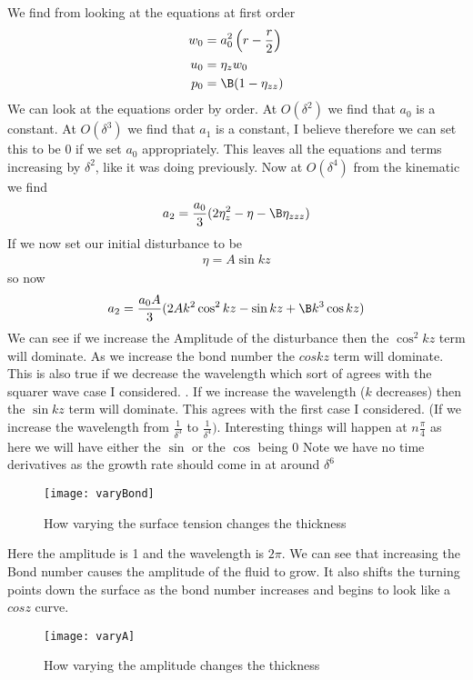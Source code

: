 \documentclass[12pt]{article}
\begin{document}
	We find from looking at the equations at first order
	\begin{align}
	w_0 &=a_0^2\left(r-\frac{r}{2}\right)\\
	u_0 & = \eta_z w_0 \\
	p_0 & = \B(1- \eta_{zz})
	\end{align}
	We can look at the equations order by order. 
	At $O(\delta^2)$ we find that $a_0$ is a constant.  At $O(\delta^3)$ we find that $a_1$ is a constant, I believe therefore we can set this to be 0 if we set $a_0$ appropriately. This leaves all the equations and terms increasing by $\delta^2$, like it was doing previously. Now at $O(\delta^4)$ from the kinematic we find
	\begin{align}
	a_2 = \frac{a_0}{3}(2\eta_z^2-\eta -\B \eta_{zzz})
	\end{align}   
	If we now set our initial disturbance to be 
	\begin{align}
	\eta = A \sin k z
	\end{align}
	so now 
	\begin{align}
	a_2  = \frac{a_0A}{3}(2Ak^2\cos^2 kz -\sin kz +\B k^3\cos kz)
	\end{align}
	We can see if we increase the Amplitude of the disturbance then the $\cos^2 kz$ term will dominate. As we increase the bond number the $cos kz$ term will dominate. This is also true if we decrease the wavelength which sort of agrees with the squarer wave case I considered. . If we increase the wavelength ($k$ decreases) then the $\sin kz$ term will dominate. This agrees with the first case I considered. (If we increase the wavelength from $\frac{1}{\delta^3}$ to $\frac{1}{\delta^4})$. Interesting things will happen at $n\frac{\pi}{4}$ as here we will have either the $\sin$ or the $\cos$ being 0
	Note we have no time derivatives as the growth rate should come in at around $\delta^6$
	\begin{figure}[H]
		\centering
		\caption{How varying the surface tension changes the thickness}
		\texttt{[image: varyBond]}
		\end{figure}
		Here the amplitude is 1 and the wavelength is $2\pi$. We can see that increasing the Bond number causes the amplitude of the fluid to grow. It also shifts the turning points down the surface as the bond number increases and begins to look like a $cos z$ curve.
	\begin{figure}[H]
		\centering
		\caption{How varying the amplitude changes the thickness}
		\texttt{[image: varyA]}
	\end{figure}
\end{document}
